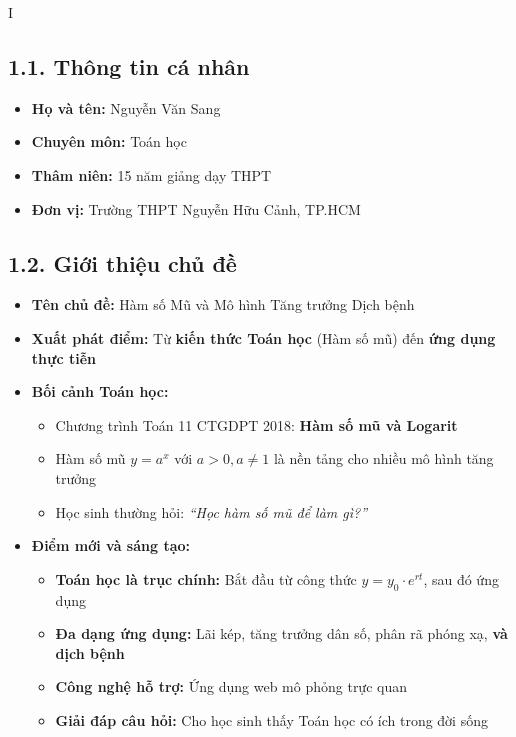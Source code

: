 \documentclass[12pt,a4paper]{article}
\begin{document}
\tableofcontents
\thispagestyle{empty}

\begin{competitionsection}{I}
\vspace{0.5cm}
\subsection*{1.1. Thông tin cá nhân}
\begin{itemize}[leftmargin=*,noitemsep]
\item \textbf{Họ và tên:} Nguyễn Văn Sang
\item \textbf{Chuyên môn:} Toán học
\item \textbf{Thâm niên:} 15 năm giảng dạy THPT
\item \textbf{Đơn vị:} Trường THPT Nguyễn Hữu Cảnh, TP.HCM
\end{itemize}

\subsection*{1.2. Giới thiệu chủ đề}
\begin{itemize}[leftmargin=*,noitemsep]
\item \textbf{Tên chủ đề:} \textcolor{mathblue}{Hàm số Mũ và Mô hình Tăng trưởng Dịch bệnh}
\item \textbf{Xuất phát điểm:} Từ \textbf{kiến thức Toán học} (Hàm số mũ) đến \textbf{ứng dụng thực tiễn}
\item \textbf{Bối cảnh Toán học:}
    \begin{itemize}
    \item Chương trình Toán 11 CTGDPT 2018: \textbf{Hàm số mũ và Logarit}
    \item Hàm số mũ $y = a^x$ với $a > 0, a \neq 1$ là nền tảng cho nhiều mô hình tăng trưởng
    \item Học sinh thường hỏi: \textit{``Học hàm số mũ để làm gì?''}
    \end{itemize}
\item \textbf{Điểm mới và sáng tạo:}
    \begin{itemize}
    \item \textbf{Toán học là trục chính:} Bắt đầu từ công thức $y = y_0 \cdot e^{rt}$, sau đó ứng dụng
    \item \textbf{Đa dạng ứng dụng:} Lãi kép, tăng trưởng dân số, phân rã phóng xạ, \textbf{và dịch bệnh}
    \item \textbf{Công nghệ hỗ trợ:} Ứng dụng web mô phỏng trực quan
    \item \textbf{Giải đáp câu hỏi:} Cho học sinh thấy Toán học có ích trong đời sống
    \end{itemize}
\end{itemize}


\end{competitionsection}
\end{document}

